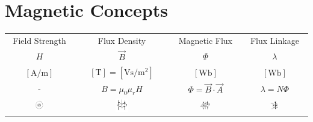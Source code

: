 \documentclass[12pt]{article}
\begin{document}
\section{Magnetic Concepts}
\begin{center}
	\begin{tabular}{cccc}
		Field Strength & Flux Density & Magnetic Flux & Flux Linkage \\
		$H$ & $\vec{B}$ & $\Phi$ & $\lambda$ \\
		$[\unit{\ampere\per\meter}]$ &
		$[\unit{\tesla}] = [\unit{\volt\second\per\meter\squared}]$ &
		$[\unit{\weber}]$ &
		$[\unit{\weber}]$ \\
		- &
		$B = \mu_0 \mu_r H$ &
		$ \Phi = \vec{B} \cdot \vec{A}  $ &
		$ \lambda = N \Phi $ \\
		\includegraphics[width=0.15\textwidth]{xfigs/strength/strength.pdf} &
		\includegraphics[width=0.15\textwidth]{xfigs/density/density.pdf} &
		\includegraphics[width=0.15\textwidth]{xfigs/flux/flux.pdf} &
		\includegraphics[width=0.15\textwidth]{xfigs/linkage/linkage.pdf} &
	\end{tabular}
\end{center}
\end{document}

